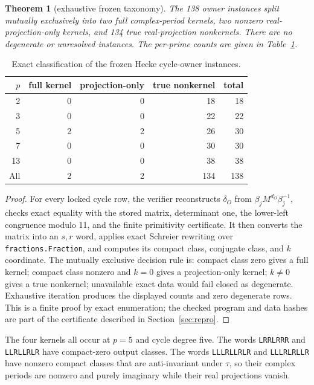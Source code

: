\documentclass[11pt]{article}
\newtheorem{theorem}{Theorem}[section]
\theoremstyle{definition}
\theoremstyle{remark}
\begin{document}
\begin{theorem}[exhaustive frozen taxonomy]\label{thm:taxonomy}
The 138 owner instances split mutually exclusively into two full complex-period kernels, two nonzero real-projection-only kernels, and 134 true real-projection nonkernels. There are no degenerate or unresolved instances. The per-prime counts are given in Table~\ref{tab:instances}.
\end{theorem}

\begin{table}[ht]
\centering
\caption{Exact classification of the frozen Hecke cycle-owner instances.}
\label{tab:instances}
\begin{tabular}{rrrrr}
\toprule
$p$ & full kernel & projection-only & true nonkernel & total\\
\midrule
2  & 0 & 0 & 18 & 18\\
3  & 0 & 0 & 22 & 22\\
5  & 2 & 2 & 26 & 30\\
7  & 0 & 0 & 30 & 30\\
13 & 0 & 0 & 38 & 38\\
\midrule
All & 2 & 2 & 134 & 138\\
\bottomrule
\end{tabular}
\end{table}

\begin{proof}
For every locked cycle row, the verifier reconstructs $\delta_O$ from $\beta_jM^{d_O}\beta_j^{-1}$, checks exact equality with the stored matrix, determinant one, the lower-left congruence modulo 11, and the finite primitivity certificate. It then converts the matrix into an $s,r$ word, applies exact Schreier rewriting over \texttt{fractions.Fraction}, and computes its compact class, conjugate class, and $k$ coordinate. The mutually exclusive decision rule is: compact class zero gives a full kernel; compact class nonzero and $k=0$ gives a projection-only kernel; $k\neq0$ gives a true nonkernel; unavailable exact data would fail closed as degenerate. Exhaustive iteration produces the displayed counts and zero degenerate rows. This is a finite proof by exact enumeration; the checked program and data hashes are part of the certificate described in Section~\ref{sec:repro}.
\end{proof}

The four kernels all occur at $p=5$ and cycle degree five. The words \texttt{LRRLRRR} and \texttt{LLRLLRLR} have compact-zero output classes. The words \texttt{LLLRLLRLR} and \texttt{LLLRLRLLR} have nonzero compact classes that are anti-invariant under $\tau$, so their complex periods are nonzero and purely imaginary while their real projections vanish.
\end{document}
